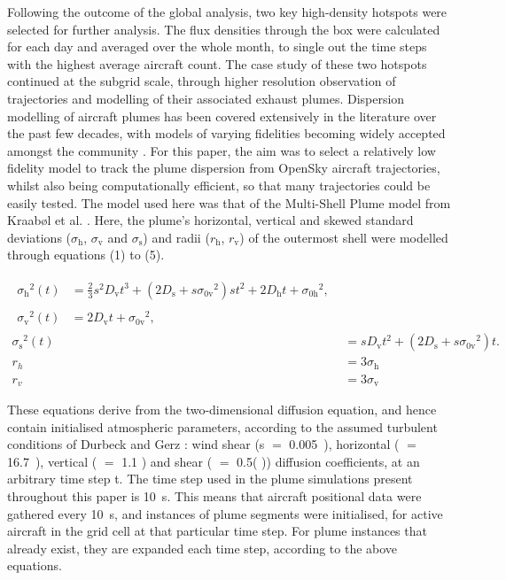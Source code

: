 Following the outcome of the global analysis, two key high-density hotspots were selected for further analysis. The flux densities through the box were calculated for each day and averaged over the whole month, to single out the time steps with the highest average aircraft count. The case study of these two hotspots continued at the subgrid scale, through higher resolution observation of trajectories and modelling of their associated exhaust plumes. Dispersion modelling of aircraft plumes has been covered extensively in the literature over the past few decades, with models of varying fidelities becoming widely accepted amongst the community \cite{Paoli2011}. For this paper, the aim was to select a relatively low fidelity model to track the plume dispersion from OpenSky aircraft trajectories, whilst also being computationally efficient, so that many trajectories could be easily tested. The model used here was that of the Multi-Shell Plume model from Kraab{\o}l et al. \cite{Kraabol2000a}. Here, the plume's horizontal, vertical and skewed standard deviations ($\sigma_{\mathrm{h}}$, $\sigma_{\mathrm{v}}$ and $\sigma_{\mathrm{s}}$) and radii ($r_{\mathrm{h}}$, $r_{\mathrm{v}}$) of the outermost shell were modelled through equations (1) to (5). 

\begin{align}
\begin{split}
	\label{sigma_h}
	{\sigma_{\mathrm{h}}}^{2}(t) {}&= \frac{2}{3} s^2 D_{\mathrm{v}} t^3 + (2 D_{\mathrm{s}} + s {\sigma_{\mathrm{0v}}}^2) s t^2 + 2 D_{\mathrm{h}} t + {\sigma_{\mathrm{0h}}}^2,
\end{split} \\
\begin{split}
	{\sigma_{\mathrm{v}}}^{2}(t) {}&= 2 D_{\mathrm{v}} t + {\sigma_{\mathrm{0v}}}^2,
	\end{split}\\
	{\sigma_{\mathrm{s}}}^{2}(t) {}&= s D_{\mathrm{v}} t^2 + (2 D_{\mathrm{s}} + s {\sigma_{\mathrm{0v}}}^2) t. \\[10pt]
	r_h {}&= 3 \sigma_{\mathrm{h}} \\
	\label{r_v}
	r_v {}&= 3 \sigma_{\mathrm{v}}
\end{align}

These equations derive from the two-dimensional diffusion equation, and hence contain initialised atmospheric parameters, according to the assumed turbulent conditions of Durbeck and Gerz \cite{Durbeck1996}: wind shear (s $=$ 0.005~), horizontal ( $=$ 16.7~), vertical ( $=$ 1.1 ) and shear ( $=$ 0.5( )) diffusion coefficients, at an arbitrary time step t. The time step used in the plume simulations present throughout this paper is 10~s. This means that aircraft positional data were gathered every 10~s, and instances of plume segments were initialised, for active aircraft in the grid cell at that particular time step. For plume instances that already exist, they are expanded each time step, according to the above equations.

